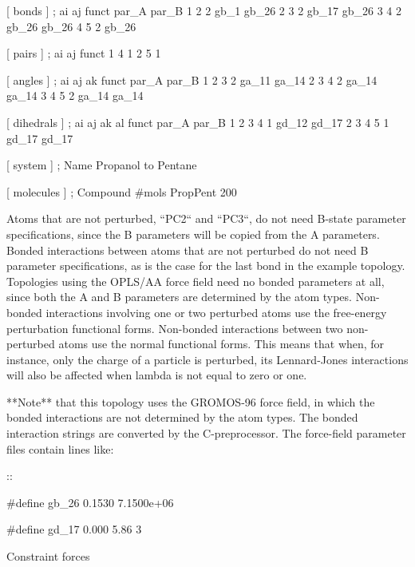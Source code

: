     [ bonds ]
    ;  ai    aj funct    par_A  par_B 
        1     2     2    gb_1   gb_26
        2     3     2    gb_17  gb_26
        3     4     2    gb_26  gb_26
        4     5     2    gb_26

    [ pairs ]
    ;  ai    aj funct
        1     4     1
        2     5     1

    [ angles ]
    ;  ai    aj    ak funct    par_A   par_B
        1     2     3     2    ga_11   ga_14
        2     3     4     2    ga_14   ga_14
        3     4     5     2    ga_14   ga_14

    [ dihedrals ]
    ;  ai    aj    ak    al funct    par_A   par_B
        1     2     3     4     1    gd_12   gd_17
        2     3     4     5     1    gd_17   gd_17

    [ system ]
    ; Name
    Propanol to Pentane

    [ molecules ]
    ; Compound        #mols
    PropPent          200

Atoms that are not perturbed, ``PC2`` and
``PC3``, do not need B-state parameter specifications, since
the B parameters will be copied from the A parameters. Bonded
interactions between atoms that are not perturbed do not need B
parameter specifications, as is the case for the last bond in the
example topology. Topologies using the OPLS/AA force field need no
bonded parameters at all, since both the A and B parameters are
determined by the atom types. Non-bonded interactions involving one or
two perturbed atoms use the free-energy perturbation functional forms.
Non-bonded interactions between two non-perturbed atoms use the normal
functional forms. This means that when, for instance, only the charge of
a particle is perturbed, its Lennard-Jones interactions will also be
affected when lambda is not equal to zero or one.

**Note** that this topology uses the GROMOS-96 force field, in which the
bonded interactions are not determined by the atom types. The bonded
interaction strings are converted by the C-preprocessor. The force-field
parameter files contain lines like:

::

    #define gb_26       0.1530  7.1500e+06

    #define gd_17     0.000       5.86          3

Constraint forces
~~~~~~~~~~~~~~~~~

